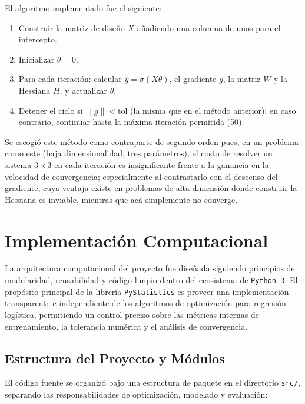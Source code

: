 El algoritmo implementado fue el siguiente:
\begin{enumerate}
    \item Construir la matriz de diseño $X$ añadiendo una columna de unos para el intercepto.
    \item Inicializar $\theta = 0$.
    \item Para cada iteración: calcular $\hat{y} = \sigma(X\theta)$, el gradiente $g$, la matriz $W$ y la Hessiana $H$, y actualizar $\theta$.
    \item Detener el ciclo si $\|g\| < \text{tol}$ (la misma que en el método anterior); en caso contrario, continuar hasta la máxima iteración permitida (50).
\end{enumerate}
Se escogió este método como contraparte de segundo orden pues, en un problema como este (baja dimensionalidad, tres parámetros), el costo de resolver un sistema $3 \times 3$ en cada iteración es insignificante frente a la ganancia en la velocidad de convergencia; especialmente al contrastarlo con el descenso del gradiente, cuya ventaja existe en problemas de alta dimensión donde construir la Hessiana es inviable, mientras que acá simplemente no converge.

\section{Implementación Computacional}

La arquitectura computacional del proyecto fue diseñada siguiendo principios de modularidad, reusabilidad y código limpio dentro del ecosistema de \texttt{Python 3}. El propósito principal de la librería \texttt{PyStatistics} es proveer una implementación transparente e independiente de los algoritmos de optimización para regresión logística, permitiendo un control preciso sobre las métricas internas de entrenamiento, la tolerancia numérica y el análisis de convergencia.

\subsection{Estructura del Proyecto y Módulos}
El código fuente se organizó bajo una estructura de paquete en el directorio \texttt{src/}, separando las responsabilidades de optimización, modelado y evaluación:

